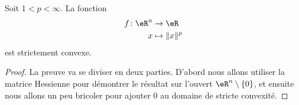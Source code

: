 \begin{proposition}     \label{PROPooLIGIooPrHYlb}
	Soit \( 1<p<\infty\). La fonction
	\begin{equation}
		\begin{aligned}
			f\colon \eR^n & \to \eR           \\
			x             & \mapsto \| x \|^p
		\end{aligned}
	\end{equation}
	est strictement convexe.
\end{proposition}

\begin{proof}
	La preuve va se diviser en deux parties. D'abord nous allons utiliser la matrice Hessienne pour démontrer le résultat sur l'ouvert \( \eR^n\setminus\{ 0 \}\), et ensuite nous allons un peu bricoler pour ajouter \( 0\) au domaine de stricte convexité.


\end{proof}
